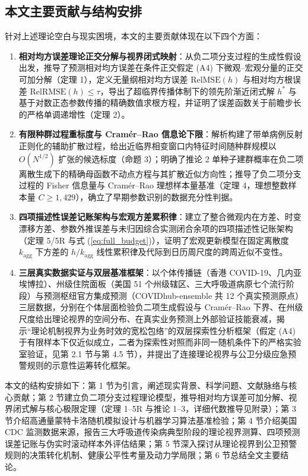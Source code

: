 \documentclass[11pt,a4paper]{article}
\theoremstyle{plain}
\theoremstyle{definition}
\begin{document}
\subsection{本文主要贡献与结构安排}

针对上述理论空白与现实困境，本文的主要贡献体现在以下四个方面：
\begin{enumerate}
\item \textbf{相对均方误差理论正交分解与视界闭式映射}：从负二项分支过程的生成性假设出发，推导了预测相对均方误差在条件正交假定 (A4) 下微观--宏观分量的正交可加分解（定理 1），定义无量纲相对均方误差 $\text{RelMSE}(h)$ 与相对均方根误差 $\text{RelRMSE}(h) \le \tau$，导出了超临界传播体制下的领先阶渐近闭式解 $h^*$ 与基于对数正态参数传播的精确数值求根方程，并证明了误差函数关于前瞻步长的严格单调递增性（定理 2）。
\item \textbf{有限种群过程重标度与 Cram\'er--Rao 信息论下限}：解析构建了带单病例反射正则化的辅助扩散过程，给出近临界相变窗口内特征时间随种群规模以 $O(N^{1/2})$ 扩张的候选标度（命题 3）；明确了推论 2 单种子建群概率在负二项离散生成下的精确母函数不动点方程与其扩散近似方向性；推导了负二项分支过程的 Fisher 信息量与 Cram\'er--Rao 理想样本量基准（定理 4，理想整数样本量 $C \ge 1{,}429$），确立了早期参数识别的数据充分性判据。
\item \textbf{四项描述性误差记账架构与宏观方差累积律}：建立了整合微观内在方差、时变漂移方差、参数外推误差与未归因综合实测闭合余项的四项描述性记账架构（定理 5/5R 与式 (\ref{eq:full_budget})），证明了宏观更新模型在固定离散度 $k_{\text{agg}}$ 下方差的 $h/k_{\text{agg}}$ 线性累积律及代际到日历周尺度的跨周近似不变性。
\item \textbf{三层真实数据实证与双层基准框架}：以个体传播链（香港 COVID-19、几内亚埃博拉）、州级住院面板（美国 51 个州级辖区、三大呼吸道病原七个流行阶段）与预测枢纽官方集成预测（COVIDhub-ensemble 共 12 个真实预测原点）三层数据，分别在个体层面检验负二项生成假设与 Cram\'er--Rao 下界、在州级尺度给出理论视界的空间分布、在真实业务预测上外部验证技能衰减，揭示“理论机制视界为业务时效的宽松包络”的双层探索性分析框架（假定 (A4) 于有限样本下仅近似成立，二者为探索性对照而非同一随机条件下的严格实验室验证，见第 2.1 节与第 4.5 节），并提出了连接理论视界与公卫分级应急预警规则的示意性运筹转化框架。
\end{enumerate}

本文的结构安排如下：第 1 节为引言，阐述现实背景、科学问题、文献脉络与核心贡献；第 2 节建立负二项分支过程理论模型，推导相对均方误差可加分解、视界闭式解与核心极限定理（定理 1--5R 与推论 1--3，详细代数推导见附录）；第 3 节介绍高通量蒙特卡洛随机模拟设计与机器学习算法基准检验；第 4 节介绍美国 CDC 监测数据来源，报告三大呼吸道传染病典型阶段的理论视界测算、四项预测误差记账与伪实时滚动样本外评估结果；第 5 节深入探讨从理论视界到公卫预警规则的决策转化机制、健康公平性考量及动力学局限；第 6 节总结全文主要结论。
\end{document}
